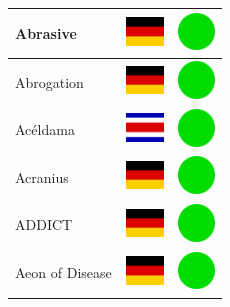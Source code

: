 \documentclass[12pt, a4paper, twoside]{report}
\begin{document}
\begin{center}
\begin{longtable}{|p{5cm}|p{2cm}|p{2cm}|}
 Abrasive                                                   & \includegraphics[width=1cm]{../4x3/de} &   \includegraphics[width=1cm]{../likes/y} \\ \hline
 Abrogation                                                 & \includegraphics[width=1cm]{../4x3/de} &   \includegraphics[width=1cm]{../likes/y} \\ \hline
 Acéldama                                                   & \includegraphics[width=1cm]{../4x3/cr} &   \includegraphics[width=1cm]{../likes/y} \\ \hline
 Acranius                                                   & \includegraphics[width=1cm]{../4x3/de} &   \includegraphics[width=1cm]{../likes/y} \\ \hline
 ADDICT                                                     & \includegraphics[width=1cm]{../4x3/de} &   \includegraphics[width=1cm]{../likes/y} \\ \hline
 Aeon of Disease                                            & \includegraphics[width=1cm]{../4x3/de} &   \includegraphics[width=1cm]{../likes/y} \\ \hline

\end{longtable}
\end{center}
\end{document}
